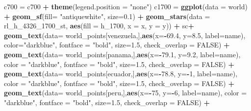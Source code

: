 \documentclass[12pt,oneside]{reedthesis}
\newenvironment{Shaded}{\begin{snugshade}}{\end{snugshade}}
\newcommand{\DataTypeTok}[1]{\textcolor[rgb]{0.13,0.29,0.53}{#1}}
\newcommand{\DecValTok}[1]{\textcolor[rgb]{0.00,0.00,0.81}{#1}}
\newcommand{\FloatTok}[1]{\textcolor[rgb]{0.00,0.00,0.81}{#1}}
\newcommand{\KeywordTok}[1]{\textcolor[rgb]{0.13,0.29,0.53}{\textbf{#1}}}
\newcommand{\NormalTok}[1]{#1}
\newcommand{\OperatorTok}[1]{\textcolor[rgb]{0.81,0.36,0.00}{\textbf{#1}}}
\newcommand{\OtherTok}[1]{\textcolor[rgb]{0.56,0.35,0.01}{#1}}
\newcommand{\StringTok}[1]{\textcolor[rgb]{0.31,0.60,0.02}{#1}}
\begin{document}
\begin{Shaded}
\begin{Highlighting}[]
\NormalTok{c700 =}\StringTok{ }\NormalTok{c700 }\OperatorTok{+}\StringTok{ }\KeywordTok{theme}\NormalTok{(}\DataTypeTok{legend.position =} \StringTok{"none"}\NormalTok{)}
\NormalTok{c1700 =}\StringTok{ }\KeywordTok{ggplot}\NormalTok{(}\DataTypeTok{data =}\NormalTok{ world) }\OperatorTok{+}\StringTok{ }
\StringTok{  }\KeywordTok{geom_sf}\NormalTok{(}\DataTypeTok{fill=} \StringTok{"antiquewhite"}\NormalTok{, }\DataTypeTok{size=}\FloatTok{0.1}\NormalTok{) }\OperatorTok{+}\StringTok{ }
\StringTok{  }\KeywordTok{geom_stars}\NormalTok{(}\DataTypeTok{data =}\NormalTok{ rl_h_}\DecValTok{4326}\NormalTok{_}\DecValTok{1700}\NormalTok{_st, }\KeywordTok{aes}\NormalTok{(}\DataTypeTok{fill =}\NormalTok{ h_}\DecValTok{1700}\NormalTok{, }\DataTypeTok{x =}\NormalTok{ x, }\DataTypeTok{y =}\NormalTok{ y)) }\OperatorTok{+}\StringTok{ }
\StringTok{  }\NormalTok{sc}\OperatorTok{+}
\StringTok{  }\KeywordTok{geom_text}\NormalTok{(}\DataTypeTok{data=}\NormalTok{ world_points[venezuela,],}\KeywordTok{aes}\NormalTok{(}\DataTypeTok{x=}\OperatorTok{-}\FloatTok{69.4}\NormalTok{, }\DataTypeTok{y=}\FloatTok{8.5}\NormalTok{, }\DataTypeTok{label=}\NormalTok{name), }\DataTypeTok{color=}\StringTok{"darkblue"}\NormalTok{, }\DataTypeTok{fontface =} \StringTok{"bold"}\NormalTok{, }\DataTypeTok{size=}\FloatTok{1.5}\NormalTok{, }\DataTypeTok{check_overlap =} \OtherTok{FALSE}\NormalTok{) }\OperatorTok{+}
\StringTok{  }\KeywordTok{geom_text}\NormalTok{(}\DataTypeTok{data=}\NormalTok{ world_points[panama,],}\KeywordTok{aes}\NormalTok{(}\DataTypeTok{x=}\OperatorTok{-}\FloatTok{79.1}\NormalTok{, }\DataTypeTok{y=}\FloatTok{9.2}\NormalTok{, }\DataTypeTok{label=}\NormalTok{name), }\DataTypeTok{color =} \StringTok{"darkblue"}\NormalTok{, }\DataTypeTok{fontface =} \StringTok{"bold"}\NormalTok{, }\DataTypeTok{size=}\FloatTok{1.5}\NormalTok{, }\DataTypeTok{check_overlap =} \OtherTok{FALSE}\NormalTok{) }\OperatorTok{+}\StringTok{ }
\StringTok{  }\KeywordTok{geom_text}\NormalTok{(}\DataTypeTok{data=}\NormalTok{ world_points[ecuador,],}\KeywordTok{aes}\NormalTok{(}\DataTypeTok{x=}\OperatorTok{-}\FloatTok{78.8}\NormalTok{, }\DataTypeTok{y=}\OperatorTok{-}\DecValTok{1}\NormalTok{, }\DataTypeTok{label=}\NormalTok{name), }\DataTypeTok{color =} \StringTok{"darkblue"}\NormalTok{, }\DataTypeTok{fontface =} \StringTok{"bold"}\NormalTok{, }\DataTypeTok{size=}\FloatTok{1.5}\NormalTok{, }\DataTypeTok{check_overlap =} \OtherTok{FALSE}\NormalTok{) }\OperatorTok{+}
\StringTok{  }\KeywordTok{geom_text}\NormalTok{(}\DataTypeTok{data=}\NormalTok{ world_points[peru,],}\KeywordTok{aes}\NormalTok{(}\DataTypeTok{x=}\OperatorTok{-}\DecValTok{75}\NormalTok{, }\DataTypeTok{y=}\OperatorTok{-}\DecValTok{6}\NormalTok{, }\DataTypeTok{label=}\NormalTok{name), }\DataTypeTok{color =} \StringTok{"darkblue"}\NormalTok{, }\DataTypeTok{fontface =} \StringTok{"bold"}\NormalTok{, }\DataTypeTok{size=}\FloatTok{1.5}\NormalTok{, }\DataTypeTok{check_overlap =} \OtherTok{FALSE}\NormalTok{) }\OperatorTok{+}

\end{Highlighting}
\end{Shaded}
\end{document}

